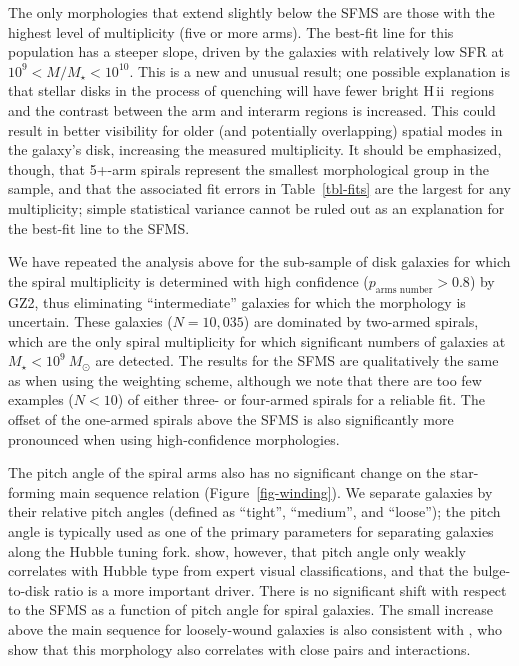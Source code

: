 \documentclass[useAMS,usenatbib]{mn2e}
\begin{document}
The only morphologies that extend slightly below the SFMS are those with the highest level of multiplicity (five or more arms). The best-fit line for this population has a steeper slope, driven by the galaxies with relatively low SFR at $10^9<M/M_\star<10^{10}$. This is a new and unusual result; one possible explanation is that stellar disks in the process of quenching will have fewer bright \mbox{H\,{\sc ii}}~regions and the contrast between the arm and interarm regions is increased. This could result in better visibility for older (and potentially overlapping) spatial modes in the galaxy's disk, increasing the measured multiplicity. It should be emphasized, though, that 5+-arm spirals represent the smallest morphological group in the sample, and that the associated fit errors in Table~\ref{tbl-fits} are the largest for any multiplicity; simple statistical variance cannot be ruled out as an explanation for the best-fit line to the SFMS.

We have repeated the analysis above for the sub-sample of disk galaxies for which the spiral multiplicity is determined with high confidence ($p_\textrm{arms~number} > 0.8$) by GZ2, thus eliminating ``intermediate'' galaxies for which the morphology is uncertain. These galaxies ($N=10,035$) are dominated by two-armed spirals, which are the only spiral multiplicity for which significant numbers of galaxies at $M_\star<10^9~M_\odot$ are detected. The results for the SFMS are qualitatively the same as when using the weighting scheme, although we note that there are too few examples ($N<10$) of either three- or four-armed spirals for a reliable fit. The offset of the one-armed spirals above the SFMS is also significantly more pronounced when using high-confidence morphologies.

The pitch angle of the spiral arms also has no significant change on the star-forming main sequence relation (Figure~\ref{fig-winding}). We separate galaxies by their relative pitch angles (defined as ``tight'', ``medium'', and ``loose''); the pitch angle is typically used as one of the primary parameters for separating galaxies along the Hubble tuning fork. \citet{wil13} show, however, that pitch angle only weakly correlates with Hubble type from expert visual classifications, and that the bulge-to-disk ratio is a more important driver. There is no significant shift with respect to the SFMS as a function of pitch angle for spiral galaxies. The small increase above the main sequence for loosely-wound galaxies is also consistent with \citet{cas13}, who show that this morphology also correlates with close pairs and interactions. 
\end{document}

